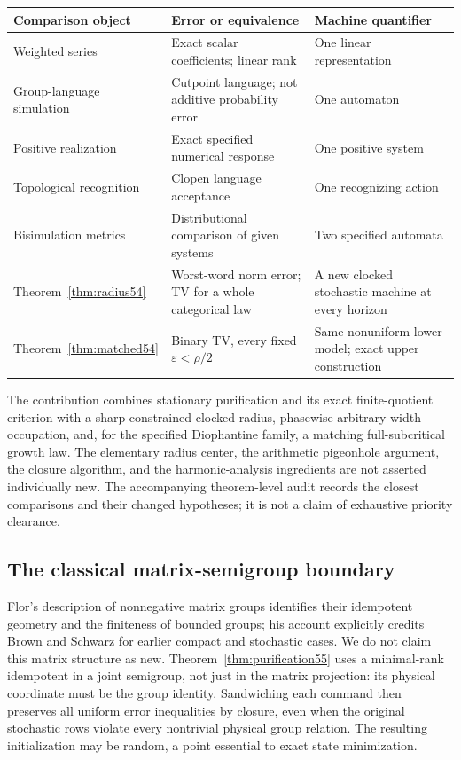 \begin{center}\small
\begin{tabular}{p{}p{}p{}}
\toprule
Comparison object & Error or equivalence & Machine quantifier\\
\midrule
Weighted series \cite{BR} & Exact scalar coefficients; linear rank & One linear representation\\
Group-language simulation \cite{BP} & Cutpoint language; not additive probability error & One automaton\\
Positive realization \cite{BF04} & Exact specified numerical response & One positive system\\
Topological recognition \cite{Steinberg} & Clopen language acceptance & One recognizing action\\
Bisimulation metrics \cite{FSZ} & Distributional comparison of given systems & Two specified automata\\
Theorem~\ref{thm:radius54} & Worst-word norm error; TV for a whole categorical law & A new clocked stochastic machine at every horizon\\
Theorem~\ref{thm:matched54} & Binary TV, every fixed $\varepsilon<\rho/2$ & Same nonuniform lower model; exact upper construction\\
\bottomrule
\end{tabular}
\end{center}
The contribution combines stationary purification and its exact finite-quotient criterion with a sharp constrained clocked radius, phasewise arbitrary-width occupation, and, for the specified Diophantine family, a matching full-subcritical growth law. The elementary radius center, the arithmetic pigeonhole argument, the closure algorithm, and the harmonic-analysis ingredients are not asserted individually new. The accompanying theorem-level audit records the closest comparisons and their changed hypotheses; it is not a claim of exhaustive priority clearance.


\subsection{The classical matrix-semigroup boundary}
Flor's description of nonnegative matrix groups \cite[Theorems 2 and 3]{Flor} identifies their idempotent geometry and the finiteness of bounded groups; his account explicitly credits Brown and Schwarz for earlier compact and stochastic cases. We do not claim this matrix structure as new. Theorem~\ref{thm:purification55} uses a minimal-rank idempotent in a joint semigroup, not just in the matrix projection: its physical coordinate must be the group identity. Sandwiching each command then preserves all uniform error inequalities by closure, even when the original stochastic rows violate every nontrivial physical group relation. The resulting initialization may be random, a point essential to exact state minimization.

